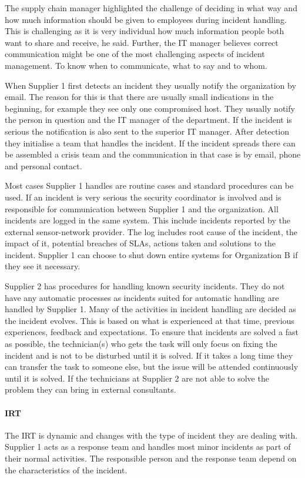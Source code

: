\documentclass[b5paper, twoside, openright, 11pt]{report}
\begin{document}
The supply chain manager highlighted the challenge of deciding in what way and how much information should be given to employees during incident handling. This is challenging as it is very individual how much information people both want to share and receive, he said. Further, the IT manager believes correct communication might be one of the most challenging aspects of incident management. To know when to communicate, what to say and to whom. 

When Supplier 1 first detects an incident they usually notify the organization by email. The reason for this is that there are usually small indications in the beginning, for example they see only one compromised host. They usually notify the person in question and the IT manager of the department. If the incident is serious the notification is also sent to the superior IT manager. After detection they initialise a team that handles the incident. If the incident spreads there can be assembled a crisis team and the communication in that case is by email, phone and personal contact. 

Most cases Supplier 1 handles are routine cases and standard procedures can be used. If an incident is very serious the security coordinator is involved and is responsible for communication between Supplier 1 and the organization. All incidents are logged in the same system. This include incidents reported by the external sensor-network provider. The log includes root cause of the incident, the impact of it, potential breaches of \acp{SLA}, actions taken and solutions to the incident. Supplier 1 can choose to shut down entire systems for Organization B if they see it necessary.

Supplier 2 has procedures for handling known security incidents. They do not have any automatic processes as incidents suited for automatic handling are handled by Supplier 1. Many of the activities in incident handling are decided as the incident evolves. This is based on what is experienced at that time, previous experiences, feedback and expectations. To ensure that incidents are solved a fast as possible, the technician(s) who gets the task will only focus on fixing the incident and is not to be disturbed until it is solved. If it takes a long time they can transfer the task to someone else, but the issue will be attended continuously until it is solved. If the technicians at Supplier 2 are not able to solve the problem they can bring in external consultants.

\paragraph{\acl{IRT}}
The \ac{IRT} is dynamic and changes with the type of incident they are dealing with. Supplier 1 acts as a response team and handles most minor incidents as part of their normal activities. The responsible person and the response team depend on the characteristics of the incident.   
\end{document}
